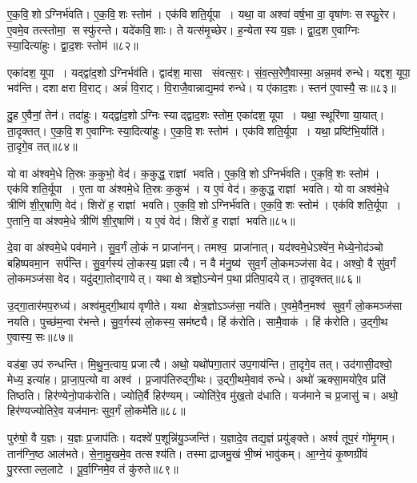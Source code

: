 ए॒क॒वि॒शोऽग्निर्भ॑वति।
ए॒क॒वि॒शः स्तोम॑।
एक॑विशति॒र्यूपा।
यथा॒ वा अश्वा॑ वर्\mbox{}ष॒भा वा॒ वृषा॑णः सस्फु॒रेर\sn{}।
ए॒वमे॒व तत्स्तोमा॒ सस्फु॑रन्ते।
यदे॑कवि॒शाः।
ते यत्स॑मृ॒च्छेर\sn{}।
ह॒न्येतास्य य॒ज्ञः।
द्वा॒द॒श ए॒वाग्निः स्या॒दित्या॑हुः।
द्वा॒द॒शः स्तोम॑॥८२॥

एका॑दश॒ यूपा।
यद्द्वा॑द॒शोऽग्निर्भव॑ति।
द्वाद॑श॒ मासा संवत्स॒रः।
सं॒व॒त्स॒रेणै॒वास्मा॒ अन्न॒मव॑ रुन्धे।
यद्दश॒ यूपा॒ भव॑न्ति।
दशाक्षरा वि॒राट्।
अन्नं॑ वि॒राट्।
वि॒राजै॒वान्नाद्य॒मव॑ रुन्धे।
य ए॑काद॒शः।
स्तन॑ ए॒वास्यै॒ सः॥८३॥

दु॒ह ए॒वैनां॒ तेन॑।
तदा॑हुः।
यद्द्वा॑द॒शोऽग्निः स्याद्द्वाद॒शः स्तोम॒ एका॑दश॒ यूपा।
यथा॒ स्थूरि॑णा या॒यात्।
ता॒दृक्तत्।
ए॒क॒वि॒श ए॒वाग्निः स्या॒दित्या॑हुः।
ए॒क॒वि॒शः स्तोम॑।
एक॑विशति॒र्यूपा।
यथा॒ प्रष्टि॑भि॒र्याति॑।
ता॒दृगे॒व तत्॥८४॥

यो वा अ॑श्वमे॒धे ति॒स्रः क॒कुभो॒ वेद॑।
क॒कुद्ध॒ राज्ञां भवति।
ए॒क॒वि॒शोऽग्निर्भ॑वति।
ए॒क॒वि॒शः स्तोम॑।
एक॑विशति॒र्यूपा।
ए॒ता वा अ॑श्वमे॒धे ति॒स्रः क॒कुभ॑।
य ए॒वं वेद॑।
क॒कुद्ध॒ राज्ञां भवति।
यो वा अश्व॑मे॒धे त्रीणि॑ शी॒र्॒षाणि॒ वेद॑।
शिरो॑ ह॒ राज्ञां भवति।
ए॒क॒वि॒शोऽग्निर्भ॑वति।
ए॒क॒वि॒शः स्तोम॑।
एक॑विशति॒र्यूपा।
ए॒तानि॒ वा अ॑श्वमे॒धे त्रीणि॑ शी॒र्॒षाणि॑।
य ए॒वं वेद॑।
शिरो॑ ह॒ राज्ञां भवति॥८५॥\anuvakamend[द्वा॒द॒शः स्तोम॒ स ए॒व तच्छिरो॑ ह॒ राज्ञां भवति॒ षट् च॑]

दे॒वा वा अ॑श्वमे॒धे पव॑माने।
सु॒व॒र्गं लो॒कं न प्राजा॑नन्।
तमश्व॒ प्राजा॑नात्।
यद॑श्वमे॒धेऽश्वे॑न॒ मेध्ये॒नोद॑ञ्चो बहिष्पवमा॒न सर्प॑न्ति।
सु॒व॒र्गस्य॑ लो॒कस्य॒ प्रज्ञात्यै।
न वै म॑नु॒ष्य॑ सुव॒र्गं लो॒कमञ्ज॑सा वेद।
अश्वो॒ वै सु॑व॒र्गं लो॒कमञ्ज॑सा वेद।
यदु॑द्गा॒तोद्गायेत्।
यथा क्षेत्रज्ञो॒ऽन्येन॑ प॒था प्र॑तिपा॒दयेत्।
ता॒दृक्तत्॥८६॥

उ॒द्गा॒तार॑मप॒रुध्य॑।
अश्व॑मुद्गी॒थाय॑ वृणीते।
यथा क्षेत्र॒ज्ञोऽञ्ज॑सा॒ नय॑ति।
ए॒वमे॒वैन॒मश्व॑ सुव॒र्गं लो॒कमञ्ज॑सा नयति।
पुच्छ॑म॒न्वा र॑भन्ते।
सु॒व॒र्गस्य॑ लो॒कस्य॒ सम॑ष्ट्यै।
हिं क॑रोति।
सामै॒वाक॑।
हिं क॑रोति।
उ॒द्गी॒थ ए॒वास्य॒ सः॥८७॥

वड॑बा॒ उप॑ रुन्धन्ति।
मि॒थु॒न॒त्वाय॒ प्रजात्यै।
अथो॒ यथो॑पगा॒तार॑ उप॒गाय॑न्ति।
ता॒दृगे॒व तत्।
उद॑गासी॒दश्वो॒ मेध्य॒ इत्या॑ह।
प्रा॒जा॒प॒त्यो वा अश्व॑।
प्र॒जाप॑तिरुद्गी॒थः।
उ॒द्गी॒थमे॒वाव॑ रुन्धे।
अथो॑ ऋक्सा॒मयो॑रे॒व प्रति॑ तिष्ठति।
हिर॑ण्येनो॒पाक॑रोति।
ज्योति॒र्वै हिर॑ण्यम्।
ज्योति॑रे॒व मु॑ख॒तो द॑धाति।
यज॑माने च प्र॒जासु॑ च।
अथो॒ हिर॑ण्यज्योतिरे॒व यज॑मानः सुव॒र्गं लो॒कमे॑ति॥८८॥\anuvakamend[तत्स उ॒पाक॑रोति च॒त्वारि॑ च]

पुरु॑षो॒ वै य॒ज्ञः।
य॒ज्ञः प्र॒जाप॑तिः।
यदश्वे॑ प॒शून्नि॑यु॒ञ्जन्ति॑।
य॒ज्ञादे॒व तद्य॒ज्ञं प्रयु॑ङ्क्ते।
अश्वं॑ तूप॒रं गो॑मृ॒गम्।
तान॑ग्नि॒ष्ठ आल॑भते।
से॒ना॒मु॒खमे॒व तत्सश्य॑ति।
तस्माद्राजमु॒खं भी॒ष्मं भावु॑कम्।
आ॒ग्ने॒यं कृ॒ष्णग्री॑वं पु॒रस्ताल्ल॒लाटे।
पू॒र्वा॒ग्निमे॒व तं कु॑रुते॥८९॥

